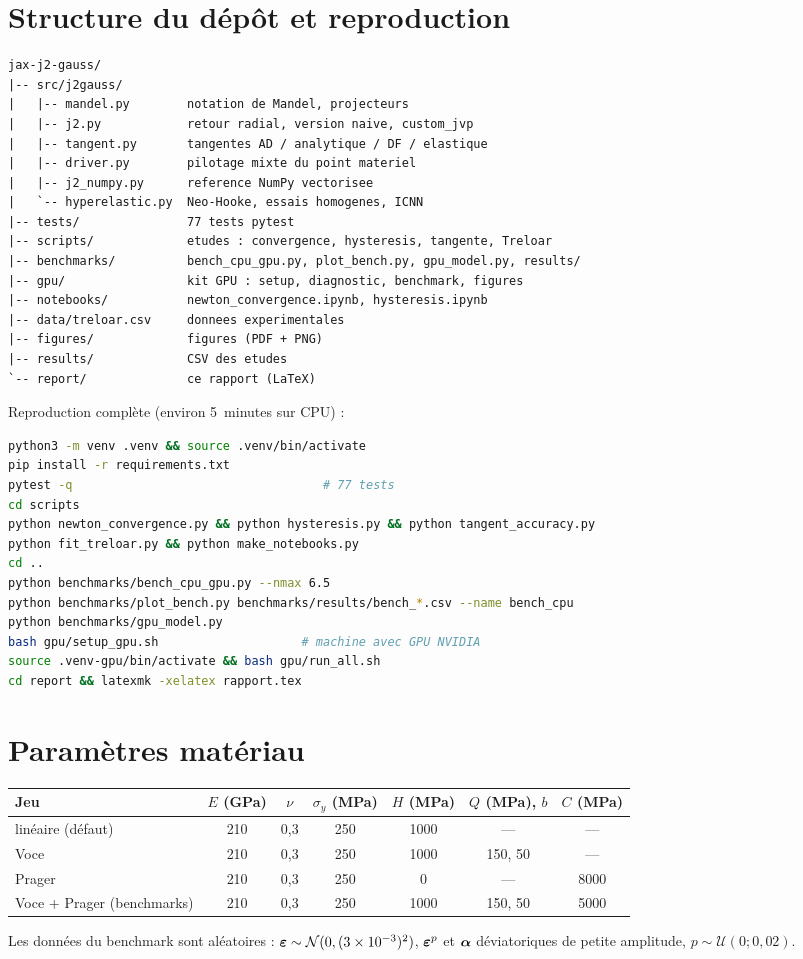 \section{Structure du dépôt et reproduction}\label{app:repo}

\begin{lstlisting}[language={}]
jax-j2-gauss/
|-- src/j2gauss/
|   |-- mandel.py        notation de Mandel, projecteurs
|   |-- j2.py            retour radial, version naive, custom_jvp
|   |-- tangent.py       tangentes AD / analytique / DF / elastique
|   |-- driver.py        pilotage mixte du point materiel
|   |-- j2_numpy.py      reference NumPy vectorisee
|   `-- hyperelastic.py  Neo-Hooke, essais homogenes, ICNN
|-- tests/               77 tests pytest
|-- scripts/             etudes : convergence, hysteresis, tangente, Treloar
|-- benchmarks/          bench_cpu_gpu.py, plot_bench.py, gpu_model.py, results/
|-- gpu/                 kit GPU : setup, diagnostic, benchmark, figures
|-- notebooks/           newton_convergence.ipynb, hysteresis.ipynb
|-- data/treloar.csv     donnees experimentales
|-- figures/             figures (PDF + PNG)
|-- results/             CSV des etudes
`-- report/              ce rapport (LaTeX)
\end{lstlisting}

Reproduction complète (environ 5~minutes sur CPU) :
\begin{lstlisting}[language=bash]
python3 -m venv .venv && source .venv/bin/activate
pip install -r requirements.txt
pytest -q                                   # 77 tests
cd scripts
python newton_convergence.py && python hysteresis.py && python tangent_accuracy.py
python fit_treloar.py && python make_notebooks.py
cd ..
python benchmarks/bench_cpu_gpu.py --nmax 6.5
python benchmarks/plot_bench.py benchmarks/results/bench_*.csv --name bench_cpu
python benchmarks/gpu_model.py
bash gpu/setup_gpu.sh                    # machine avec GPU NVIDIA
source .venv-gpu/bin/activate && bash gpu/run_all.sh
cd report && latexmk -xelatex rapport.tex
\end{lstlisting}

\section{Paramètres matériau}\label{app:params}

\begin{center}
\begin{tabular}{lcccccc}
\toprule
Jeu & $E$ (GPa) & $\nu$ & $\sigma_y$ (MPa) & $H$ (MPa) & $Q$ (MPa), $b$ & $C$ (MPa)\\
\midrule
linéaire (défaut) & 210 & 0,3 & 250 & 1000 & --- & ---\\
Voce & 210 & 0,3 & 250 & 1000 & 150, 50 & ---\\
Prager & 210 & 0,3 & 250 & 0 & --- & 8000\\
Voce + Prager (benchmarks) & 210 & 0,3 & 250 & 1000 & 150, 50 & 5000\\
\bottomrule
\end{tabular}
\end{center}
Les données du benchmark sont aléatoires : $\boldsymbol{\varepsilon}\sim\mathcal{N}(0,(3\times10^{-3})^2)$, $\boldsymbol{\varepsilon}^{p}$ et $\boldsymbol{\alpha}$ déviatoriques de petite amplitude, $p\sim\mathcal{U}(0;0{,}02)$.
